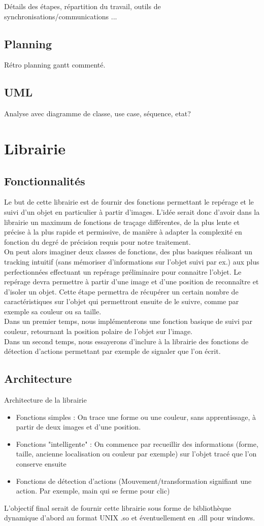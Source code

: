\documentclass{article}
\begin{document}
			Détails des étapes, répartition du travail, outils de synchronisations/communications ...
		\subsection{Planning}
			Rétro planning gantt commenté.
		\subsection{UML}
			Analyse avec diagramme de classe, use case, séquence, etat?
\newpage
	\section{Librairie}
		\subsection{Fonctionnalités}
			Le but de cette librairie est de fournir des fonctions permettant le repérage et le suivi d'un objet en particulier à partir d'images. 
			L'idée serait donc d'avoir dans la librairie un maximum de fonctions de traçage différentes, de la plus lente et précise à la plus rapide et permissive, de manière à adapter la complexité en fonction du degré de précision requis pour notre traitement. \\
			On peut alors imaginer deux classes de fonctions, des plus basiques réalisant un tracking intuitif (sans mémoriser d'informations sur l'objet suivi par ex.) aux plus perfectionnées effectuant un repérage préliminaire pour connaitre l'objet.
			Le repérage devra permettre à partir d'une image et d'une position de reconnaître et d'isoler un objet. Cette étape permettra de récupérer un certain nombre de caractéristiques sur l'objet qui permettront ensuite de le suivre, comme par exemple sa couleur ou sa taille. \\
Dans un premier temps, nous implémenterons une fonction basique de suivi par couleur, retournant la position polaire de l'objet sur l'image. \\
Dans un second temps, nous essayerons d'inclure à la librairie des fonctions de détection d'actions permettant par exemple de signaler que l'on écrit. 
		\subsection{Architecture}
			Architecture de la librairie 
			\begin{itemize}
				\item Fonctions simples : On trace une forme ou une couleur, sans apprentissage, à partir de deux images et d'une position.
				\item Fonctions "intelligente" : On commence par recueillir des informations (forme, taille, ancienne localisation ou couleur par exemple) sur l'objet tracé que l'on conserve ensuite    
				\item Fonctions de détection d'actions (Mouvement/transformation signifiant une action. Par exemple, main qui se ferme pour clic)
			\end{itemize}
			L'objectif final serait de fournir cette librairie sous forme de bibliothèque dynamique d'abord au format UNIX .so et éventuellement en .dll pour windows. 
\end{document}
